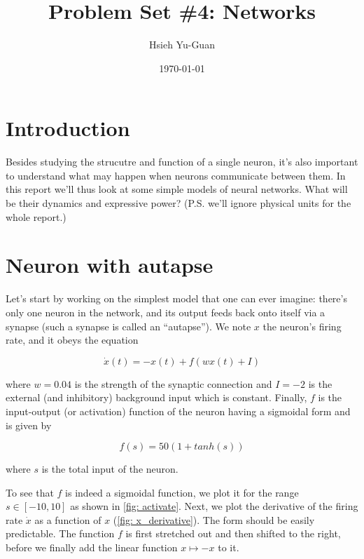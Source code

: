

\pagestyle{fancy} 
\rfoot{\thepage}
\cfoot{}
\lfoot{~\theauthor}
\renewcommand{\headrulewidth}{0.4pt}
\renewcommand{\footrulewidth}{0.4pt}


\title{Problem Set \#4: Networks \vspace{-0.5em}}
\author{Hsieh Yu-Guan}
\date{\today}
\maketitle

\thispagestyle{fancy}

\section*{Introduction}

Besides studying the strucutre and function of a single neuron, it's also
important to understand what may happen when neurons communicate between them.
In this report we'll thus look at some simple models of neural networks.
What will be their dynamics and expressive power? 
(P.S. we'll ignore physical units for the whole report.)

\section{Neuron with autapse}

Let's start by working on the simplest model that one can ever imagine:
there's only one neuron in the network, and its output feeds back onto 
itself via a synapse (such a synapse is called an ``autapse''). 
We note $x$ the neuron's firing rate, and it obeys the equation

\[\dot{x}(t) = -x(t) + f(wx(t)+I)\]

\noindent
where $w = 0.04$ is the strength of the synaptic connection and $I = -2$ 
is the external (and inhibitory) background input which is constant.
Finally, $f$ is the input-output (or activation) function of the neuron having
a sigmoidal form and is given by

\[f(s) = 50(1 + tanh(s))\]

\noindent
where $s$ is the total input of the neuron.

To see that $f$ is indeed a sigmoidal function, we plot it for the range 
$s \in [-10, 10]$ as shown in \autoref{fig: activate}. Next, we plot the
derivative of the firing rate $\dot{x}$ as a function of $x$ 
(\autoref{fig: x_derivative}). The form should be easily predictable.
The function $f$ is first stretched out and then shifted to the right,
before we finally add the linear function $x \mapsto -x$ to it.

